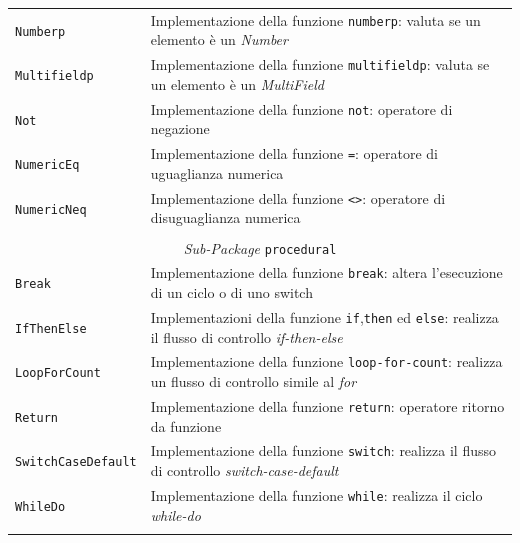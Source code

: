 \begin{longtable}{p{3.5cm}p{8.5cm}}
	\hdashline[1pt/5pt]
		\texttt{Numberp} & Implementazione della funzione \texttt{numberp}: valuta se un elemento è un \emph{Number}\\
	\hdashline[1pt/5pt]
		\texttt{Multifieldp} & Implementazione della funzione \texttt{multifieldp}: valuta se un elemento è un \emph{MultiField}\\
	\hdashline[1pt/5pt]
		\texttt{Not} & Implementazione della funzione \texttt{not}: operatore di negazione\\
	\hdashline[1pt/5pt]
		\texttt{NumericEq} & Implementazione della funzione \texttt{=}: operatore di uguaglianza numerica\\
	\hdashline[1pt/5pt]
		\texttt{NumericNeq} & Implementazione della funzione \texttt{<>}: operatore di disuguaglianza numerica\\
	\hline\\	
	
	
\multicolumn{2}{c}{\emph{Sub-Package} \texttt{procedural}}\\
	\hdashline[5pt/5pt]
		\texttt{Break} & Implementazione della funzione \texttt{break}: altera l'esecuzione di un ciclo o di uno switch\\ 
	\hdashline[1pt/5pt]
		\texttt{IfThenElse} & Implementazioni della funzione \texttt{if},\texttt{then} ed \texttt{else}: realizza il flusso di controllo \emph{if-then-else}\\ 
	\hdashline[1pt/5pt]
		\texttt{LoopForCount} & Implementazione della funzione \texttt{loop-for-count}: realizza un flusso di controllo simile al \emph{for}\\ 
	\hdashline[1pt/5pt]
		\texttt{Return} & Implementazione della funzione \texttt{return}: operatore ritorno da funzione\\ 
	\hdashline[1pt/5pt]
		\texttt{SwitchCaseDefault} & Implementazione della funzione \texttt{switch}: realizza il flusso di controllo \emph{switch-case-default}\\ 
	\hdashline[1pt/5pt]
		\texttt{WhileDo} & Implementazione della funzione \texttt{while}: realizza il ciclo \emph{while-do}\\ 
	\hline\\
	

\end{longtable}
